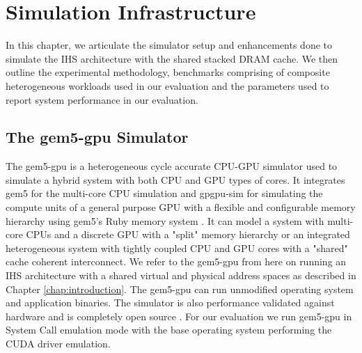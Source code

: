 \chapter{Simulation Infrastructure} \label{chap:simulator}
In this chapter, we articulate the simulator setup and enhancements done to simulate the IHS architecture with the shared stacked DRAM cache. We then outline the experimental methodology, benchmarks comprising of composite heterogeneous workloads used in our evaluation and the parameters used to report system performance in our evaluation.

\section{The gem5-gpu Simulator} \label{gem5-gpu-simulator}
The gem5-gpu \cite{gem5-gpu} is a heterogeneous cycle accurate CPU-GPU simulator used to simulate a hybrid system with both CPU and GPU types of cores. It integrates gem5 \cite{gem5} for the multi-core CPU simulation and gpgpu-sim \cite{gpgpu-sim} for simulating the compute units of a general purpose GPU with a flexible and configurable memory hierarchy using gem5's Ruby memory system \cite{gems}. It can model a system with multi-core CPUs and a discrete GPU with a "split" memory hierarchy or an integrated heterogeneous system with tightly coupled CPU and GPU cores with a "shared" cache coherent interconnect. We refer to the gem5-gpu from here on running an IHS architecture with a shared virtual and physical address spaces as described in Chapter \ref{chap:introduction}. The gem5-gpu can run unmodified operating system and application binaries. The simulator is also performance validated against hardware and is completely open source \cite{gem5-gpu}. For our evaluation we run gem5-gpu in System Call emulation mode with the base operating system performing the CUDA driver emulation.

